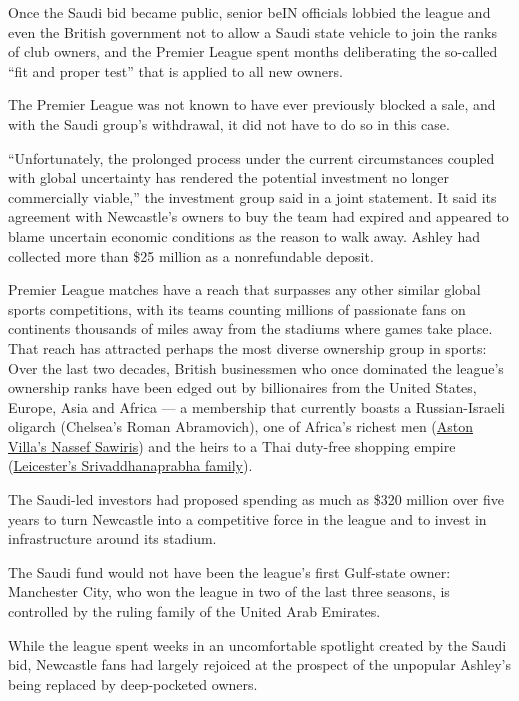 Once the Saudi bid became public, senior beIN officials lobbied the
league and even the British government not to allow a Saudi state
vehicle to join the ranks of club owners, and the Premier League spent
months deliberating the so-called ``fit and proper test'' that is
applied to all new owners.

The Premier League was not known to have ever previously blocked a sale,
and with the Saudi group's withdrawal, it did not have to do so in this
case.

``Unfortunately, the prolonged process under the current circumstances
coupled with global uncertainty has rendered the potential investment no
longer commercially viable,'' the investment group said in a joint
statement. It said its agreement with Newcastle's owners to buy the team
had expired and appeared to blame uncertain economic conditions as the
reason to walk away. Ashley had collected more than \$25 million as a
nonrefundable deposit.

Premier League matches have a reach that surpasses any other similar
global sports competitions, with its teams counting millions of
passionate fans on continents thousands of miles away from the stadiums
where games take place. That reach has attracted perhaps the most
diverse ownership group in sports: Over the last two decades, British
businessmen who once dominated the league's ownership ranks have been
edged out by billionaires from the United States, Europe, Asia and
Africa --- a membership that currently boasts a Russian-Israeli oligarch
(Chelsea's Roman Abramovich), one of Africa's richest men
(\href{https://www.birminghammail.co.uk/sport/football/football-news/who-is-nassef-sawiris-villa-17082772}{Aston
Villa's Nassef Sawiris}) and the heirs to a Thai duty-free shopping
empire
(\href{https://www.leicestermercury.co.uk/sport/football/football-news/leicester-city-owner-aiyawatt-srivaddhanaprabha-3824465}{Leicester's
Srivaddhanaprabha family}).

The Saudi-led investors had proposed spending as much as \$320 million
over five years to turn Newcastle into a competitive force in the league
and to invest in infrastructure around its stadium.

The Saudi fund would not have been the league's first Gulf-state owner:
Manchester City, who won the league in two of the last three seasons, is
controlled by the ruling family of the United Arab Emirates.

While the league spent weeks in an uncomfortable spotlight created by
the Saudi bid, Newcastle fans had largely rejoiced at the prospect of
the unpopular Ashley's being replaced by deep-pocketed owners.

